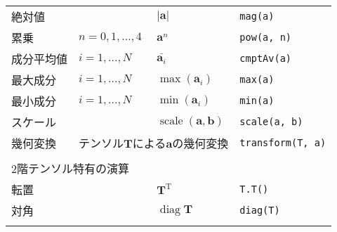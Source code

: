 \begin{longtable}{Xlll}
\index{mag@\verb+mag+!tensorのメンバかんすう@\OFclass{tensor}のメンバ関数}%
 絶対値 &  & $|\bm{a}|$ & \verb|mag(a)| \\
\index{tensorのメンバかんすう@\OFclass{tensor}のメンバ関数!pow@\verb+pow+}%
\index{pow@\verb+pow+!tensorのメンバかんすう@\OFclass{tensor}のメンバ関数}%
 累乗 & $n = 0, 1, \dots, 4$ & $\bm{a}^{n}$ & \verb|pow(a, n)| \\
\index{tensorのメンバかんすう@\OFclass{tensor}のメンバ関数!cmptAv@\verb+cmptAv+}%
\index{cmptAv@\verb+cmptAv+!tensorのメンバかんすう@\OFclass{tensor}のメンバ関数}%
 成分平均値 & $i = 1, \dots, N$ & $\bar{\bm{a}_{i}}$ & \verb|cmptAv(a)| \\
\index{tensorのメンバかんすう@\OFclass{tensor}のメンバ関数!max@\verb+max+}%
\index{max@\verb+max+!tensorのメンバかんすう@\OFclass{tensor}のメンバ関数}%
 最大成分 & $i = 1, \dots, N$ & $\max(\bm{a}_{i})$ & \verb|max(a)| \\
\index{tensorのメンバかんすう@\OFclass{tensor}のメンバ関数!min@\verb+min+}%
\index{min@\verb+min+!tensorのメンバかんすう@\OFclass{tensor}のメンバ関数}%
 最小成分 & $i = 1, \dots, N$ & $\min(\bm{a}_{i})$ & \verb|min(a)| \\
\index{tensorのメンバかんすう@\OFclass{tensor}のメンバ関数!scale@\verb+scale+}%
\index{scale@\verb+scale+!tensorのメンバかんすう@\OFclass{tensor}のメンバ関数}%
 スケール &  & $\mathop{\mathrm{scale}}(\bm{a}, \bm{b})$ & \verb|scale(a, b)| \\
\index{tensorのメンバかんすう@\OFclass{tensor}のメンバ関数!transform@\verb+transform+}%
\index{transform@\verb+transform+!tensorのメンバかんすう@\OFclass{tensor}のメンバ関数}%
 幾何変換 & \multicolumn{2}{r}{テンソル$\bm{T}$による$\bm{a}$の幾何変換} & \verb|transform(T, a)| \\
 \\
 \multicolumn{4}{l}{\sffamily\gtfamily 2階テンソル特有の演算} \\
 \hline
 \tblstrut
\index{tensorのメンバかんすう@\OFclass{tensor}のメンバ関数!T()@\verb+T()+}%
\index{T()@\verb+T()+!tensorのメンバかんすう@\OFclass{tensor}のメンバ関数}%
 転置 &  & $\bm{T}^{\mathrm{T}}$ & \verb|T.T()| \\
\index{tensorのメンバかんすう@\OFclass{tensor}のメンバ関数!diag@\verb+diag+}%
\index{diag@\verb+diag+!tensorのメンバかんすう@\OFclass{tensor}のメンバ関数}%
 対角 &  & $\mathop{\mathrm{diag}}\bm{T}$ & \verb|diag(T)| \\
\index{tensorのメンバかんすう@\OFclass{tensor}のメンバ関数!tr@\verb+tr+}%
\index{tr@\verb+tr+!tensorのメンバかんすう@\OFclass{tensor}のメンバ関数}%

\end{longtable}
